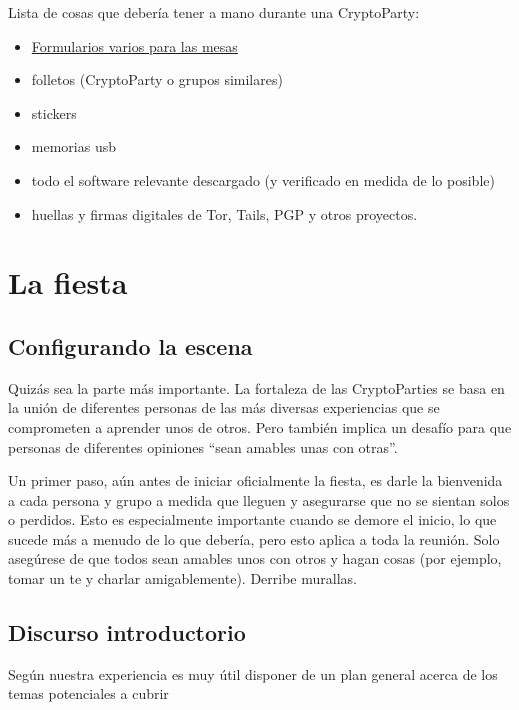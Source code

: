 \documentclass[10pt,a5paper,twoside,,]{book}
\providecommand{\tightlist}{%
  \setlength{\itemsep}{0pt}\setlength{\parskip}{0pt}}
\begin{document}
Lista de cosas que debería tener a mano durante una CryptoParty:

\begin{itemize}
\tightlist
\item
  \href{https://github.com/cryptoparty/handouts/tree/master/en}{Formularios
  varios para las mesas}
\item
  folletos (CryptoParty o grupos similares)
\item
  stickers
\item
  memorias usb
\item
  todo el software relevante descargado (y verificado en medida de lo
  posible)
\item
  huellas y firmas digitales de Tor, Tails, PGP y otros proyectos.
\end{itemize}

\section{La fiesta}\label{la-fiesta}

\subsection{Configurando la escena}\label{configurando-la-escena}

Quizás sea la parte más importante. La fortaleza de las CryptoParties se
basa en la unión de diferentes personas de las más diversas experiencias
que se comprometen a aprender unos de otros. Pero también implica un
desafío para que personas de diferentes opiniones ``sean amables unas
con otras''.

Un primer paso, aún antes de iniciar oficialmente la fiesta, es darle la
bienvenida a cada persona y grupo a medida que lleguen y asegurarse que
no se sientan solos o perdidos. Esto es especialmente importante cuando
se demore el inicio, lo que sucede más a menudo de lo que debería, pero
esto aplica a toda la reunión. Solo asegúrese de que todos sean amables
unos con otros y hagan cosas (por ejemplo, tomar un te y charlar
amigablemente). Derribe murallas.

\subsection{Discurso introductorio}\label{discurso-introductorio}

Según nuestra experiencia es muy útil disponer de un plan general acerca
de los temas potenciales a cubrir
\end{document}
